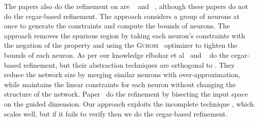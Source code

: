 The papers also do the refinement on \deeppoly{} are \deepsrgr{}~\cite{yang2021improving} and
\kpoly{}~\cite{singh2019beyond}, 
although these papers do not do the cegar-based refinement. The approach \kpoly{} considers 
a group of neurons at once to generate the constraints and compute the bounds of neurons. 
The approach \deepsrgr{} removes the 
spurious region by taking each neuron's constraints with the negation of the property and using the 
\textsc{Gurobi}~\cite{gurobioptimizer} optimizer to tighten the bounds of each neuron. 
As per our knowledge elbohar et al~\cite{elboher2020abstraction} and \narv{}~\cite{liu2022abstraction} 
do the cegar-based refinement, but their abstraction techniques are orthogonal to \deeppoly{}. 
They reduce the network size by merging similar 
neurons with over-approximation, while \deeppoly{} maintains the linear constraints for each neuron without changing the 
structure of the network. Paper~\cite{lin2020art} do the refinement by bisecting the input space on the guided dimension. 
Our approach exploits the incomplete technique \deeppoly{},
which scales well, but if it fails to verify then we do the cegar-based refinement.

